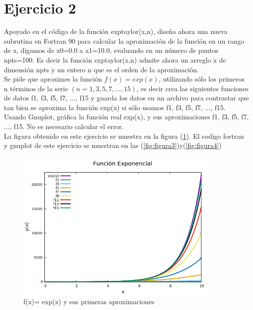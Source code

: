 \documentclass[12pt,a4paper,twoside]{article}
\begin{document}
\section{Ejercicio 2}
Apoyado en el código de la función  exptaylor(x,n), diseña ahora una nueva subrutina en Fortran 90 para calcular la aproximación de la función en un rango de x, digamos de x0=0.0 a x1=10.0, evaluando en un número de puntos npts=100. Es decir la función exptaylor(x,n) admite ahora un arreglo x de dimensión npts y un entero n que es el orden de la aproximación.\\
Se pide que aproximes la función $f(x)= exp(x)$, utilizando sólo los primeros n términos de la serie $(n=1,3,5,7,...,15 )$, es decir crea las siguientes funciones de datos f1, f3, f5, f7, ..., f15 y guarda los datos en un archivo para contrastar que tan bien se aproxima la función exp(x) si sólo usamos f1, f3, f5, f7, ..., f15. Usando Gnuplot, gráfica la función real exp(x), y sus aproximaciones f1, f3, f5, f7, ..., f15. No es necesario calcular el error. \\
La figura obtenido en este ejercicio se muestra en la figura (\ref{fig:figura2}). El codigo fortran y gnuplot de este ejercicio se muestran en las (\ref{fig:figura3})y(\ref{fig:figura4})
\begin{figure}[h]
\centering
\includegraphics[width=10cm]{Ejercicio2.png} 
\caption{f(x)= exp(x) y sus primeras aproximaciones }
\label{fig:figura2}
\end{figure}
\end{document}
